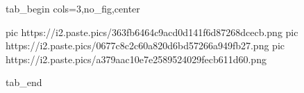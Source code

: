  
 
 
 
 


\ifcmt
  tab_begin cols=3,no_fig,center

     pic https://i2.paste.pics/363fb6464c9acd0d141f6d87268dcecb.png
		 pic https://i2.paste.pics/0677c8c2c60a820d6bd57266a949fb27.png
		 pic https://i2.paste.pics/a379aac10e7e2589524029fecb611d60.png

  tab_end
\fi
